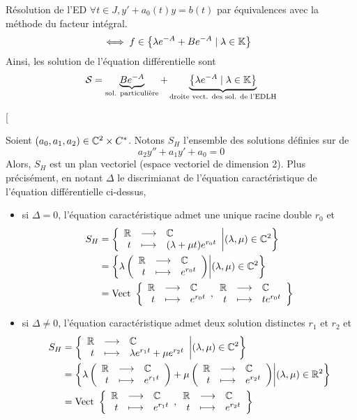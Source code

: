 \documentclass{article}
\begin{document}
\begin{question_kholle}{Résolution de l'ED  $\forall t \in J, y' + a_{0}(t)y = b(t)$ par équivalences avec la méthode du facteur intégral.}
\begin{align*}
                                                                                                                          & \iff f\in \left\{\lambda e^{-A}+B e^{-A} \mid \lambda\in\mathbb K\right\}
  \end{align*}
  Ainsi, les solution de l’équation différentielle sont
  \[
    \mathcal{S}=\underbrace{B e^{-A}}_{\text{sol. particulière}} + \underbrace{\left\{\lambda e^{-A} \mid \lambda\in\mathbb K\right\}}_{\text{droite vect. des sol. de l'EDLH}}
  \]
\end{question_kholle}

\begin{question_kholle}[{
  Soient \((a_{0}, a_{1}, a_{2})\in\mathbb C^2\times C^*\). Notons \(S_H\) l’ensemble des solutions définies sur \R de
  \[
    a_{2}y''+a_{1}y' + a_{0}=0
  \]
  Alors, $S_{H}$ est un plan vectoriel (espace vectoriel de dimension 2). Plus précisément, en notant $\Delta$ le discrimianat de l'équation caractéristique de l'équation différentielle ci-dessus,
  \begin{itemize}[label=$\star$]
    \item si $\Delta=0$, l'équation caractéristique admet une unique racine double $r_{0}$ et
          \begin{align*}
            S_{H} & =\left\{\begin{array}{rcl} \mathbb R & \longrightarrow & \mathbb C \\ t & \longmapsto & (\lambda+\mu t)e^{r_{0}t} \end{array} \middle| (\lambda, \mu)\in\mathbb C^{2}\right\}        \\
                  & = \left\{\lambda \left(\begin{array}{rcl} \mathbb R & \longrightarrow & \mathbb C \\ t & \longmapsto & e^{r_{0}t} \end{array}\right) \middle| (\lambda, \mu)\in\mathbb C^{2}\right\} \\
                  & =  \text{Vect } \left\{\begin{array}{rcl} \mathbb R & \longrightarrow & \mathbb C \\ t & \longmapsto & e^{r_{0}t} \end{array}, \begin{array}{rcl} \mathbb R & \longrightarrow & \mathbb C \\ t & \longmapsto & t e^{r_{0}t} \end{array}\right\}
          \end{align*}
    \item si $\Delta\neq 0$, l’équation caractéristique admet deux solution distinctes $r_{1}$ et $r_{2}$ et
          \begin{align*}
            S_{H} & = \left\{\begin{array}{rcl} \mathbb R & \longrightarrow & \mathbb C \\ t & \longmapsto & \lambda e^{r_{1}t} + \mu e^{r_{2}t} \end{array} \middle| (\lambda, \mu)\in\mathbb C^{2}\right\}                                              \\
                  & = \left\{\lambda\left(\begin{array}{rcl} \mathbb R & \longrightarrow & \mathbb C \\ t & \longmapsto & e^{r_{1}t} \end{array}\right) + \mu \left(\begin{array}{rcl} \mathbb R & \longrightarrow & \mathbb C \\ t & \longmapsto & e^{r_{2}t} \end{array}\right) \middle| (\lambda, \mu)\in\mathbb R^{2}\right\} \\
                  & = \text{Vect } \left\{\begin{array}{rcl} \mathbb R & \longrightarrow & \mathbb C \\ t & \longmapsto & e^{r_{1}t} \end{array}, \begin{array}{rcl} \mathbb R & \longrightarrow & \mathbb C \\ t & \longmapsto & e^{r_{2}t} \end{array}\right\}
          \end{align*}
  \end{itemize}
}
\end{question_kholle}
\end{document}
